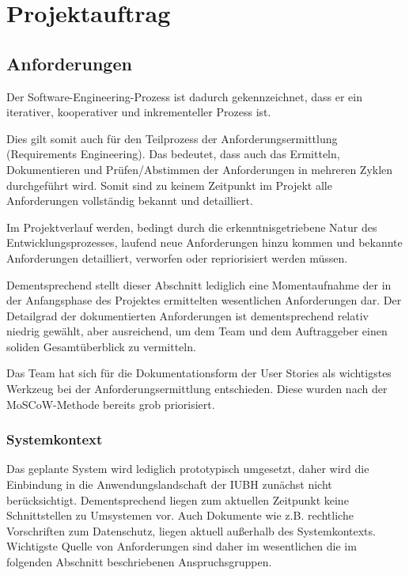 \documentclass[a4paper,11pt,listof=numbered,glossary=totoc,parskip=half]{scrreprt}
\begin{document}
	\chapter{Projektauftrag}

	\section{Anforderungen}

Der Software-Engineering-Prozess ist dadurch gekennzeichnet, dass er ein iterativer, kooperativer und inkrementeller Prozess ist.

Dies gilt somit auch für den Teilprozess der Anforderungsermittlung (Requirements Engineering).
Das bedeutet, dass auch das Ermitteln, Dokumentieren und Prüfen/Abstimmen der Anforderungen in mehreren Zyklen durchgeführt wird. Somit sind zu keinem Zeitpunkt im Projekt alle Anforderungen vollständig bekannt und detailliert.

Im Projektverlauf werden, bedingt durch die erkenntnisgetriebene Natur des Entwicklungsprozesses, laufend neue Anforderungen hinzu kommen und bekannte Anforderungen detailliert, verworfen oder repriorisiert werden müssen. 

Dementsprechend stellt dieser Abschnitt lediglich eine Momentaufnahme der in der Anfangsphase des Projektes ermittelten wesentlichen Anforderungen dar. Der Detailgrad der dokumentierten Anforderungen ist dementsprechend relativ niedrig gewählt, aber ausreichend, um dem Team und dem Auftraggeber einen soliden Gesamtüberblick zu vermitteln.

Das Team hat sich für die Dokumentationsform der User Stories als wichtigstes Werkzeug bei der Anforderungsermittlung entschieden. Diese wurden nach der MoSCoW-Methode bereits grob priorisiert.

\subsection{Systemkontext}

Das geplante System wird lediglich prototypisch umgesetzt, daher wird die Einbindung in die Anwendungslandschaft der IUBH zunächst nicht berücksichtigt.
Dementsprechend liegen zum aktuellen Zeitpunkt keine Schnittstellen zu Umsystemen vor.
Auch Dokumente wie z.B. rechtliche Vorschriften zum Datenschutz, liegen aktuell außerhalb des Systemkontexts.
Wichtigste Quelle von Anforderungen sind daher im wesentlichen die im folgenden Abschnitt beschriebenen Anspruchsgruppen.
\end{document}
